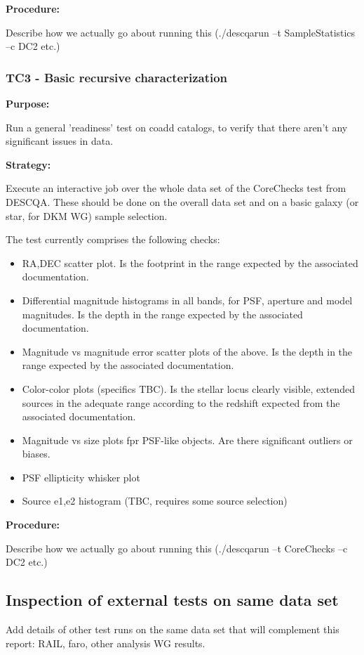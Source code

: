 \documentclass[12pt, a4paper]{article}
\begin{document}
\textbf{Procedure:} 

Describe how we actually go about running this (./descqarun --t SampleStatistics --c DC2 etc.)


\subsubsection{TC3 - Basic recursive characterization}
\textbf{Purpose:} 

Run a general 'readiness' test on coadd catalogs, to verify that there aren't any significant issues in data. 

\textbf{Strategy:} 

Execute an interactive job over the whole data set of the CoreChecks test from DESCQA. These should be done on the overall data set and on a basic galaxy (or star, for DKM WG) sample selection.

The test currently comprises the following checks:
\begin{itemize}
	\item RA,DEC scatter plot. Is the footprint in the range expected by the associated documentation.
	\item Differential magnitude histograms in all bands, for PSF, aperture and model magnitudes. Is the depth in the range expected by the associated documentation.
	\item Magnitude vs magnitude error scatter plots of the above. Is the depth in the range expected by the associated documentation.
	\item Color-color plots (specifics TBC). Is the stellar locus clearly visible, extended sources in the adequate range according to the redshift expected from the associated documentation.
	\item Magnitude vs size plots fpr PSF-like objects. Are there significant outliers or biases.
	\item PSF ellipticity whisker plot
	\item Source e1,e2 histogram (TBC, requires some source selection)
\end{itemize}

\textbf{Procedure:} 

Describe how we actually go about running this (./descqarun --t CoreChecks --c DC2 etc.)

\subsection{Inspection of external tests on same data set}
Add details of other test runs on the same data set that will complement this report: RAIL, faro, other analysis WG results.
\end{document}

